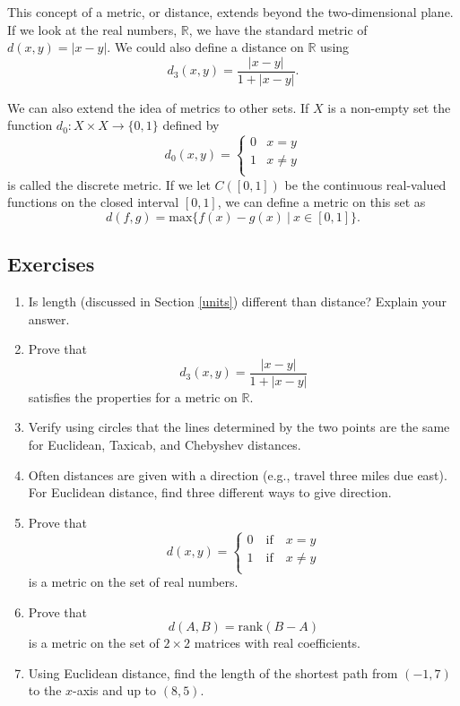 \documentclass[
]{book}
\theoremstyle{definition}
\theoremstyle{definition}
\theoremstyle{definition}
\theoremstyle{definition}
\theoremstyle{remark}
\begin{document}
This concept of a metric, or distance, extends beyond the two-dimensional plane. If we look at the real numbers, \(\mathbb{R}\), we have the standard metric of \(d(x,y)=|x-y|\). We could also define a distance on \(\mathbb{R}\) using
\[d_3(x,y) = \frac{|x-y|}{1+|x-y|}.\]

We can also extend the idea of metrics to other sets. If \(X\) is a non-empty set the function \(d_0:X\times X \rightarrow \{0,1\}\) defined by \[d_0(x,y)=\begin{cases}
0 & x=y \\
1 & x\neq y \\
\end{cases}\] is called the discrete metric. If we let \(C([0,1])\) be the continuous real-valued functions on the closed interval \([0,1]\), we can define a metric on this set as \[d(f,g) = \mbox{max} \{ f(x)-g(x) \: \vert \: x\in [0,1]\}.\]

\hypertarget{exercises-47}{%
\subsection{Exercises}\label{exercises-47}}

\begin{enumerate}
\def\labelenumi{\arabic{enumi}.}
\item
  Is length (discussed in Section \ref{units}) different than distance? Explain your answer.
\item
  Prove that \[d_3(x,y) = \frac{|x-y|}{1+|x-y|}\] satisfies the properties for a metric on \(\mathbb{R}\).
\item
  Verify using circles that the lines determined by the two points are the same for Euclidean, Taxicab, and Chebyshev distances.
\item
  Often distances are given with a direction (e.g., travel three miles due east). For Euclidean distance, find three different ways to give direction.
\item
  Prove that \[d(x,y)= \left\{ \begin{array}{l}
  0 \quad \mbox{if} \quad x=y \\
  1 \quad \mbox{if} \quad x\neq y\\
  \end{array} \right.\]
  is a metric on the set of real numbers.
\item
  Prove that \[d(A,B)=\mbox{rank} (B-A)\] is a metric on the set of \(2\times 2\) matrices with real coefficients.
\item
  Using Euclidean distance, find the length of the shortest path from \((-1,7)\) to the \(x\)-axis and up to \((8,5)\).
\end{enumerate}
\end{document}
